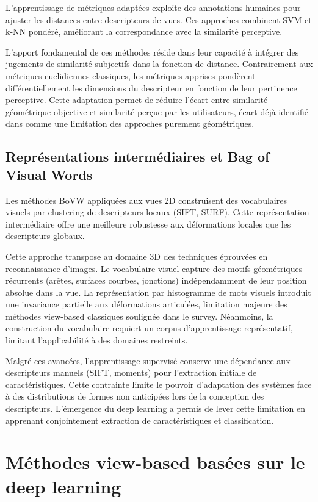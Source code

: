 \documentclass[11pt,a4paper,oneside]{report}
\begin{document}
L'apprentissage de métriques adaptées \cite{eitz2012sketch} exploite des annotations humaines pour ajuster les distances entre descripteurs de vues. Ces approches combinent SVM et k-NN pondéré, améliorant la correspondance avec la similarité perceptive.

L'apport fondamental de ces méthodes réside dans leur capacité à intégrer des jugements de similarité subjectifs dans la fonction de distance. Contrairement aux métriques euclidiennes classiques, les métriques apprises pondèrent différentiellement les dimensions du descripteur en fonction de leur pertinence perceptive. Cette adaptation permet de réduire l'écart entre similarité géométrique objective et similarité perçue par les utilisateurs, écart déjà identifié dans \cite{tangelder2007survey} comme une limitation des approches purement géométriques.

\subsection{Représentations intermédiaires et Bag of Visual Words}

Les méthodes BoVW appliquées aux vues 2D \cite{toldo20093d} construisent des vocabulaires visuels par clustering de descripteurs locaux (SIFT, SURF). Cette représentation intermédiaire offre une meilleure robustesse aux déformations locales que les descripteurs globaux.

Cette approche transpose au domaine 3D des techniques éprouvées en reconnaissance d'images. Le vocabulaire visuel capture des motifs géométriques récurrents (arêtes, surfaces courbes, jonctions) indépendamment de leur position absolue dans la vue. La représentation par histogramme de mots visuels introduit une invariance partielle aux déformations articulées, limitation majeure des méthodes view-based classiques soulignée dans le survey. Néanmoins, la construction du vocabulaire requiert un corpus d'apprentissage représentatif, limitant l'applicabilité à des domaines restreints.

Malgré ces avancées, l'apprentissage supervisé conserve une dépendance aux descripteurs manuels (SIFT, moments) pour l'extraction initiale de caractéristiques. Cette contrainte limite le pouvoir d'adaptation des systèmes face à des distributions de formes non anticipées lors de la conception des descripteurs. L'émergence du deep learning a permis de lever cette limitation en apprenant conjointement extraction de caractéristiques et classification.

\section{Méthodes view-based basées sur le deep learning}
\end{document}
